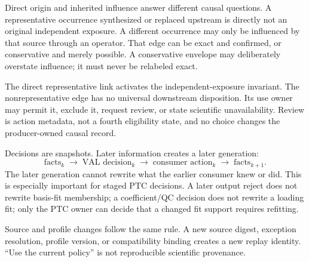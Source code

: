\documentclass[10pt]{article}
\begin{document}
Direct origin and inherited influence answer different causal questions. A
representative occurrence synthesized or replaced upstream is directly not an
original independent exposure. A different occurrence may only be influenced
by that source through an operator. That edge can be exact and confirmed, or
conservative and merely possible. A conservative envelope may deliberately
overstate influence; it must never be relabeled exact.

\begin{center}
\end{center}

The direct representative link activates the independent-exposure invariant.
The nonrepresentative edge has no universal downstream disposition. Its use
owner may permit it, exclude it, request review, or state scientific
unavailability. Review is action metadata, not a fourth eligibility state,
and no choice changes the producer-owned causal record.

Decisions are snapshots. Later information creates a later generation:
\[
\text{facts}_k\;\longrightarrow\;\text{VAL decision}_k
\;\longrightarrow\;\text{consumer action}_k
\;\longrightarrow\;\text{facts}_{k+1}.
\]
The later generation cannot rewrite what the earlier consumer knew or did.
This is especially important for staged PTC decisions. A later output reject
does not rewrite basis-fit membership; a coefficient/QC decision does not
rewrite a loading fit; only the PTC owner can decide that a changed fit support
requires refitting.

Source and profile changes follow the same rule. A new source digest,
exception resolution, profile version, or compatibility binding creates a new
replay identity. ``Use the current policy'' is not reproducible scientific
provenance.
\end{document}
